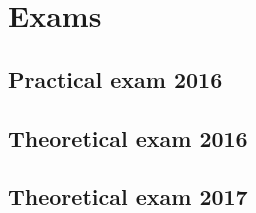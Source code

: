% 
% 
% 
% 
% 
% 
% 
% 
% 
% 
% 


\part{Exams}
\def\difficulty{0}
\chapter{Practical exam 2016}


\chapter{Theoretical exam 2016}


\chapter{Theoretical exam 2017}


\printindex





\newpage





